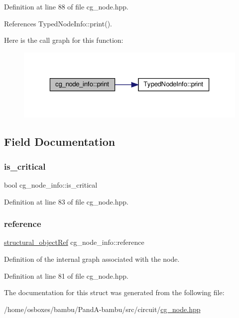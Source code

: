 Definition at line 88 of file cg\+\_\+node.\+hpp.



References Typed\+Node\+Info\+::print().

Here is the call graph for this function\+:
\nopagebreak
\begin{figure}[H]
\begin{center}
\leavevmode
\includegraphics[width=323pt]{d4/d21/structcg__node__info_a010ce271e49a819e639abc65ec0cbdcc_cgraph}
\end{center}
\end{figure}


\subsection{Field Documentation}
\mbox{\label{structcg__node__info_a2216c06cfbe94974c1072139e5e97e83}} 
\subsubsection{\texorpdfstring{is\+\_\+critical}{is\_critical}}
{\footnotesize\ttfamily bool cg\+\_\+node\+\_\+info\+::is\+\_\+critical}



Definition at line 83 of file cg\+\_\+node.\+hpp.

\mbox{\label{structcg__node__info_a539bc087cb00cfeefd4d6d1829af12db}} 
\subsubsection{\texorpdfstring{reference}{reference}}
{\footnotesize\ttfamily \hyperlink{structural__objects_8hpp_a8ea5f8cc50ab8f4c31e2751074ff60b2}{structural\+\_\+object\+Ref} cg\+\_\+node\+\_\+info\+::reference}



Definition of the internal graph associated with the node. 



Definition at line 81 of file cg\+\_\+node.\+hpp.



The documentation for this struct was generated from the following file\+:\begin{DoxyCompactItemize}
\item 
/home/osboxes/bambu/\+Pand\+A-\/bambu/src/circuit/\hyperlink{cg__node_8hpp}{cg\+\_\+node.\+hpp}\end{DoxyCompactItemize}
